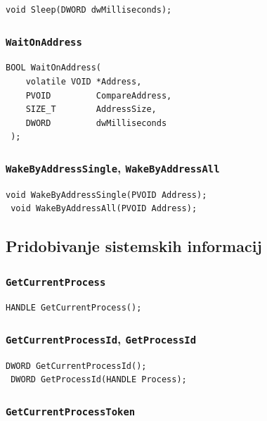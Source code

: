 \documentclass[a4paper,12pt,openright]{book}
\begin{document}
\begin{lstlisting}[style=func]
 void Sleep(DWORD dwMilliseconds);
\end{lstlisting}

\subsubsection{\texttt{WaitOnAddress}}

\begin{lstlisting}[style=func]
 BOOL WaitOnAddress(
	volatile VOID *Address,
	PVOID         CompareAddress,
	SIZE_T        AddressSize,
	DWORD         dwMilliseconds
 );
\end{lstlisting}

\subsubsection{\texttt{WakeByAddressSingle}, \texttt{WakeByAddressAll}}

\begin{lstlisting}[style=func]
 void WakeByAddressSingle(PVOID Address);
 void WakeByAddressAll(PVOID Address);
\end{lstlisting}

\subsection{Pridobivanje sistemskih informacij}

\subsubsection{\texttt{GetCurrentProcess}}

\begin{lstlisting}[style=func]
 HANDLE GetCurrentProcess();
\end{lstlisting}

\subsubsection{\texttt{GetCurrentProcessId}, \texttt{GetProcessId}}

\begin{lstlisting}[style=func]
 DWORD GetCurrentProcessId();
 DWORD GetProcessId(HANDLE Process);
\end{lstlisting}

\subsubsection{\texttt{GetCurrentProcessToken}}
\end{document}
